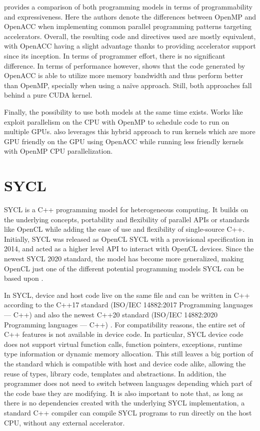 \cite{openmp_vs_openacc} provides a comparison of both programming models in terms of programmability and expressiveness. Here the authors denote the differences between OpenMP and OpenACC when implementing common parallel programming patterns targeting accelerators. Overall, the resulting code and directives used are mostly equivalent, with OpenACC having a slight advantage thanks to providing accelerator support since its inception. In terms of programmer effort, there is no significant difference. In terms of performance however, \cite{cuda_openacc_openmp_performance} shows that the code generated by OpenACC is able to utilize more memory bandwidth and thus perform better than OpenMP, specially when using a naïve approach. Still, both approaches fall behind a pure CUDA kernel.

Finally, the possibility to use both models at the same time exists. Works like \cite{openmp_openacc_multigpus} exploit parallelism on the CPU with OpenMP to schedule code to run on multiple GPUs. \cite{openmp_openacc_molecular_docking} also leverages this hybrid approach to run kernels which are more GPU friendly on the GPU using OpenACC while running less friendly kernels with OpenMP CPU parallelization.

\section{SYCL} \label{sect:sycl}
SYCL \cite{sycl_2020_standard} is a C++ programming model for heterogeneous computing. It builds on the underlying concepts, portability and flexibility of parallel APIs or standards like OpenCL while adding the ease of use and flexibility of single-source C++. Initially, SYCL was released as OpenCL SYCL with a provisional specification in 2014, and acted as a higher level API to interact with OpenCL devices. Since the newest SYCL 2020 standard, the model has become more generalized, making OpenCL just one of the different potential programming models SYCL can be based upon \cite{sycl_faq}.

In SYCL, device and host code live on the same file and can be written in C++ according to the C++17 standard (ISO/IEC 14882:2017 Programming languages — C++) \cite{cpp17} and also the newest C++20 standard (ISO/IEC 14882:2020 Programming languages — C++) \cite{cpp20}. For compatibility reasons, the entire set of C++ features is not available in device code. In particular, SYCL device code does not support virtual function calls, function pointers, exceptions, runtime type information or dynamic memory allocation.  This still leaves a big portion of the standard which is compatible with host and device code alike, allowing the reuse of types, library code, templates and abstractions. In addition, the programmer does not need to switch between languages depending which part of the code base they are modifying. It is also important to note that, as long as there is no dependencies created with the underlying SYCL implementation, a standard C++ compiler can compile SYCL programs to run directly on the host CPU, without any external accelerator.

